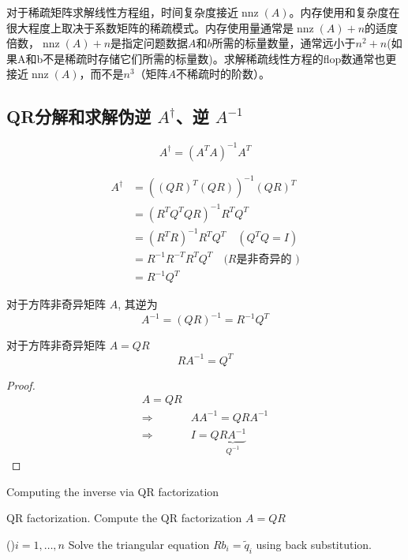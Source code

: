 对于稀疏矩阵求解线性方程组，时间复杂度接近$\operatorname{nnz}(A)$。内存使用和复杂度在很大程度上取决于系数矩阵的稀疏模式。内存使用量通常是$\operatorname{nnz}(A)+n$的适度倍数，$\operatorname{nnz}(A)+n$是指定问题数据$A$和$b$所需的标量数量，通常远小于$n^2+n$(如果A和b不是稀疏时存储它们所需的标量数)。求解稀疏线性方程的flop数通常也更接近$\operatorname{nnz}(A)$，而不是$n^3$（矩阵$A$不稀疏时的阶数）。


\subsection{QR分解和求解伪逆 $A^{\dagger}$、逆 $A^{-1}$}

\begin{definition}
    $$A^{\dagger}=\left(A^{T} A\right)^{-1} A^{T}$$
\end{definition}

\begin{theorem}
    $$
\begin{aligned}
A^{\dagger}&=\left((Q R)^{T}(Q R)\right)^{-1}(Q R)^{T} \\
&=\left(R^{T} Q^{T} Q R\right)^{-1} R^{T} Q^{T} \\
&=\left(R^{T} R\right)^{-1} R^{T} Q^{T} \quad\left(Q^{T} Q=I\right) \\
&=R^{-1} R^{-T} R^{T} Q^{T} \quad(R{\text {是非奇异的 })} \\
 &={R^{-1} Q^{T}}
\end{aligned}
$$
\end{theorem}

\begin{corollary}
    对于方阵非奇异矩阵 ${A}$, 其逆为
$$
A^{-1}=(Q R)^{-1}=R^{-1} Q^{T}
$$
\end{corollary}

\begin{corollary}
    对于方阵非奇异矩阵 ${A} = QR$
    $$RA^{-1} = Q^T$$
\end{corollary}

\begin{proof}
    $$\begin{aligned}
        A = QR\\
        \Rightarrow & A A^{-1} = QRA^{-1}\\
        \Rightarrow & I = Q\underbrace{RA^{-1} }_{Q^{-1}}
    \end{aligned}$$
\end{proof}

\begin{algorithm}[htbp]
    \caption{Computing the inverse via QR factorization}

    QR factorization. Compute the QR factorization $ A=Q R $\;

    \For(){$ i=1, \ldots, n $}{
        Solve the triangular equation $ R b_{i}=\tilde{q}_{i} $ using back substitution.
    }
\end{algorithm}

